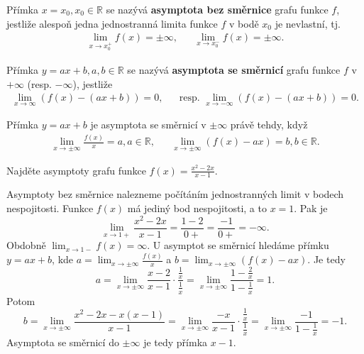 \begin{definition}
Přímka $x=x_0,x_0\in \mathbb R$ se nazývá \textbf{asymptota bez směrnice}
grafu funkce $f$, jestliže alespoň jedna jednostranná limita funkce $f$
v bodě $x_0$ je nevlastní, tj.
\begin{align*}
    \lim_{x\to x_0^+} f(x) = \pm\infty, & & \lim_{x\to x_0^-} f(x)=\pm\infty.
\end{align*}
\end{definition}

\begin{definition}
Přímka $y=ax+b, a,b\in \mathbb R$ se nazývá \textbf{asymptota se směrnicí} grafu
funkce $f$ v $+\infty$ (resp. $-\infty$), jestliže
\begin{align*}
    \lim_{x\to\infty}(f(x)-(ax+b))=0, & & \textrm{resp. }\lim_{x\to-\infty}(f(x)-(ax+b))=0.
\end{align*}
\end{definition}

\begin{veta}
    Přímka $y=ax+b$ je asymptota se směrnicí v $\pm\infty$ právě tehdy, když
    \begin{align*}
        \lim_{x\to\pm\infty}\frac{f(x)}{x}=a, a\in \mathbb R, & & \lim_{x\to\pm\infty}(f(x)-ax)=b,b \in \mathbb R.
    \end{align*}
\end{veta}

\begin{priklad}
Najděte asymptoty grafu funkce $f(x)=\frac{x^2-2x}{x-1}.$
\end{priklad}

\begin{reseni}
Asymptoty bez směrnice nalezneme počítáním jednostranných limit v bodech nespojitosti. Funkce $f(x)$ má jediný
bod nespojitosti, a to $x = 1$. Pak je
$$
\lim_{x \to 1 +} \frac{x^2-2x}{x-1} = \frac{1-2}{0+} = \frac{-1}{0+} = -\infty.
$$
Obdobně $\lim_{x \to 1 -}f(x) = \infty$. U asymptot se směrnicí hledáme přímku $y=ax+b$,
kde $a=\lim_{x\to \pm \infty}\frac{f(x)}{x}$ a
$b=\lim_{x\to \pm \infty}(f(x)-ax).$ Je tedy
$$
    a = \lim_{x\to \pm \infty} \frac{x-2}{x-1} \cdot \frac{\frac{1}{x}}{\frac{1}{x}} = \lim_{x\to \pm \infty} \frac{1 - \frac{2}{x}}{1 - \frac{1}{x}} = 1.
$$
Potom
$$
    b= \lim_{x\to \pm \infty} \frac{x^2 - 2x - x(x-1)}{x-1} = \lim_{x\to \pm \infty} \frac{-x}{x-1} \cdot \frac{\frac{1}{x}}{\frac{1}{x}} = \lim_{x\to \pm \infty} \frac{-1}{1 - \frac{1}{x}} = -1.
$$
Asymptota se směrnicí do $\pm \infty$ je tedy přímka $x-1$.
\end{reseni}


